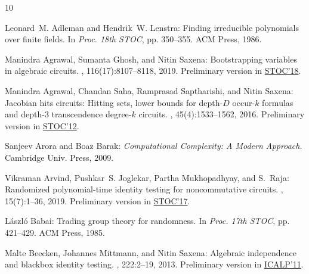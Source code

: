 \documentclass[11pt]{article}
\numberwithin{equation}{section}
\theoremstyle{definition}
\theoremstyle{plain}
\begin{document}
\tocrefpdfbookmark
\begin{thebibliography}{10}

{\sc Leonard~M. Adleman and Hendrik~W. Lenstra}: Finding irreducible
  polynomials over finite fields.
\newblock In {\em Proc. 18th STOC}, pp. 350--355. ACM Press, 1986.
\newblock [\epfmtdoi{10.1145/12130.12166}]

{\sc Manindra Agrawal, Sumanta Ghosh, and Nitin Saxena}: Bootstrapping
  variables in algebraic circuits.
, 116(17):8107--8118, 2019.
\newblock Preliminary version in
  \href{https://dl.acm.org/citation.cfm?id=3188762}{STOC'18}.

{\sc Manindra Agrawal, Chandan Saha, Ramprasad Saptharishi, and Nitin Saxena}:
  Jacobian hits circuits: {H}itting sets, lower bounds for depth-{$D$}
  occur-$k$ formulas and depth-3 transcendence degree-$k$ circuits.
, 45(4):1533--1562, 2016.
\newblock Preliminary version in
  \href{https://dl.acm.org/citation.cfm?id=2214033&dl=ACM&coll=DL}{STOC'12}.

{\sc Sanjeev Arora and Boaz Barak}: {\em Computational Complexity: A Modern
  Approach}.
\newblock Cambridge Univ. Press, 2009.

{\sc Vikraman Arvind, Pushkar~S. Joglekar, Partha Mukhopadhyay, and S.~Raja}:
  Randomized polynomial-time identity testing for noncommutative circuits.
, 15(7):1--36, 2019.
\newblock Preliminary version in
  \href{https://doi.org/10.1145/3055399.3055442}{STOC'17}.

{\sc L{\'a}szl{\'o} Babai}: Trading group theory for randomness.
\newblock In {\em Proc. 17th STOC}, pp. 421--429. ACM Press, 1985.
\newblock [\epfmtdoi{10.1145/22145.22192}]

{\sc Malte Beecken, Johannes Mittmann, and Nitin Saxena}: Algebraic
  independence and blackbox identity testing.
, 222:2--19, 2013.
\newblock Preliminary version in
  \href{https://link.springer.com/chapter/10.1007/978-3-642-22012-8_10}{ICALP'11}.


\end{thebibliography}
\end{document}
